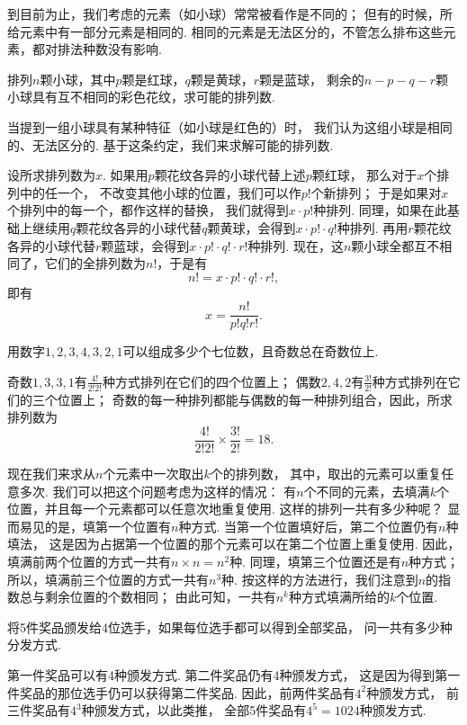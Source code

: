 到目前为止，我们考虑的元素（如小球）常常被看作是不同的；
但有的时候，所给元素中有一部分元素是相同的.
相同的元素是无法区分的，不管怎么排布这些元素，都对排法种数没有影响.

\begin{example}
排列\(n\)颗小球，其中\(p\)颗是红球，\(q\)颗是黄球，\(r\)颗是蓝球，
剩余的\(n-p-q-r\)颗小球具有互不相同的彩色花纹，求可能的排列数.
\begin{solution}
当提到一组小球具有某种特征（如小球是红色的）时，
我们认为这组小球是相同的、无法区分的.
基于这条约定，我们来求解可能的排列数.

设所求排列数为\(x\).
如果用\(p\)颗花纹各异的小球代替上述\(p\)颗红球，
那么对于\(x\)个排列中的任一个，
不改变其他小球的位置，我们可以作\(p!\)个新排列；
于是如果对\(x\)个排列中的每一个，都作这样的替换，
我们就得到\(x \cdot p!\)种排列.
同理，如果在此基础上继续用\(q\)颗花纹各异的小球代替\(q\)颗黄球，会得到\(x \cdot p! \cdot q!\)种排列.
再用\(r\)颗花纹各异的小球代替\(r\)颗蓝球，会得到\(x \cdot p! \cdot q! \cdot r!\)种排列.
现在，这\(n\)颗小球全都互不相同了，它们的全排列数为\(n!\)，于是有\[
	n! = x \cdot p! \cdot q! \cdot r!,
\]即有\[
	x = \frac{n!}{p! q! r!}.
\]
\end{solution}
\end{example}

\begin{example}
用数字\(1,2,3,4,3,2,1\)可以组成多少个七位数，且奇数总在奇数位上.
\begin{solution}
奇数\(1,3,3,1\)有\(\frac{4!}{2! 2!}\)种方式排列在它们的四个位置上；
偶数\(2,4,2\)有\(\frac{3!}{2!}\)种方式排列在它们的三个位置上；
奇数的每一种排列都能与偶数的每一种排列组合，因此，所求排列数为\[
	\frac{4!}{2! 2!} \times \frac{3!}{2!} = 18.
\]
\end{solution}
\end{example}

现在我们来求从\(n\)个元素中一次取出\(k\)个的排列数，
其中，取出的元素可以重复任意多次.
我们可以把这个问题考虑为这样的情况：
有\(n\)个不同的元素，去填满\(k\)个位置，并且每一个元素都可以任意次地重复使用.
这样的排列一共有多少种呢？
显而易见的是，填第一个位置有\(n\)种方式.
当第一个位置填好后，第二个位置仍有\(n\)种填法，
这是因为占据第一个位置的那个元素可以在第二个位置上重复使用.
因此，填满前两个位置的方式一共有\(n \times n = n^2\)种.
同理，填第三个位置还是有\(n\)种方式；
所以，填满前三个位置的方式一共有\(n^3\)种.
按这样的方法进行，我们注意到\(n\)的指数总与剩余位置的个数相同；
由此可知，一共有\(n^k\)种方式填满所给的\(k\)个位置.

\begin{example}
将5件奖品颁发给4位选手，如果每位选手都可以得到全部奖品，
问一共有多少种分发方式.
\begin{solution}
第一件奖品可以有4种颁发方式.
第二件奖品仍有4种颁发方式，
这是因为得到第一件奖品的那位选手仍可以获得第二件奖品.
因此，前两件奖品有\(4^2\)种颁发方式，
前三件奖品有\(4^3\)种颁发方式，以此类推，
全部5件奖品有\(4^5=1024\)种颁发方式.
\end{solution}
\end{example}

